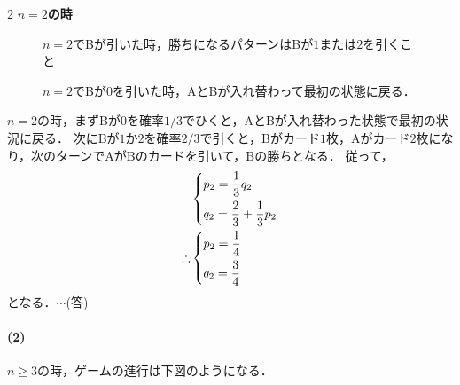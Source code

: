 \documentclass[../../main.tex]{subfiles}
\begin{document}
\begin{multicols}{2}
  \textbf{$n=2$の時}

  \begin{figure}[H]
    \centering
    \caption{$n=2$でBが引いた時，勝ちになるパターンはBが$1$または$2$を引くこと}
  \end{figure}

  \begin{figure}[H]
    \centering
    \caption{$n=2$でBが$0$を引いた時，AとBが入れ替わって最初の状態に戻る．}
  \end{figure}

  $n=2$の時，まずBが$0$を確率$1/3$でひくと，AとBが入れ替わった状態で最初の状況に戻る．
  次にBが$1$か$2$を確率$2/3$で引くと，Bがカード$1$枚，Aがカード$2$枚になり，次のターンでAがBのカードを引いて，Bの勝ちとなる．
  従って，
  \begin{align}
    &
    \begin{dcases}
      p_2 = \dfrac{1}{3} q_2 \\
      q_2 = \dfrac{2}{3} + \dfrac{1}{3} p_2
    \end{dcases} \\
    \therefore
    &
    \begin{dcases}
      p_2 = \dfrac{1}{4} \\
      q_2 = \dfrac{3}{4}
    \end{dcases}
  \end{align}
  となる．$\cdots$(答)

  \paragraph{(2)}
  $n \geq 3$の時，ゲームの進行は下図のようになる．


\end{multicols}
\end{document}
